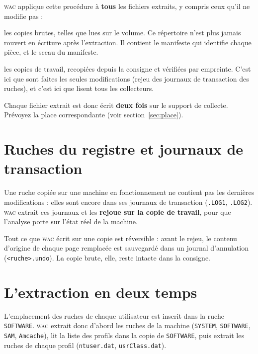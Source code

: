 \documentclass[11pt,a4paper,oneside]{report}
\newcommand{\wac}{\textsc{wac}}
\newcommand{\fichier}[1]{\texttt{#1}}
\begin{document}
\wac{} applique cette procédure à \textbf{tous} les fichiers extraits, y compris
ceux qu'il ne modifie pas :

\begin{description}[style=nextline,leftmargin=1.2em]
  \item[\fichier{consigne/}] les copies brutes, telles que lues sur le volume. Ce
        répertoire n'est plus jamais rouvert en écriture après l'extraction. Il
        contient le manifeste qui identifie chaque pièce, et le sceau du
        manifeste.
  \item[\fichier{travail/}] les copies de travail, recopiées depuis la consigne
        et vérifiées par empreinte. C'est ici que sont faites les seules
        modifications (rejeu des journaux de transaction des ruches), et c'est ici
        que lisent tous les collecteurs.
\end{description}

\begin{note}
Chaque fichier extrait est donc écrit \textbf{deux fois} sur le support de
collecte. Prévoyez la place correspondante (voir
section~\ref{sec:place}).
\end{note}

\section{Ruches du registre et journaux de transaction}

Une ruche copiée sur une machine en fonctionnement ne contient pas les dernières
modifications : elles sont encore dans ses journaux de transaction
(\fichier{.LOG1}, \fichier{.LOG2}). \wac{} extrait ces journaux et les
\textbf{rejoue sur la copie de travail}, pour que l'analyse porte sur l'état réel
de la machine.

Tout ce que \wac{} écrit sur une copie est réversible : avant le rejeu, le contenu
d'origine de chaque page remplacée est sauvegardé dans un journal d'annulation
(\fichier{<ruche>.undo}). La copie brute, elle, reste intacte dans la consigne.

\section{L'extraction en deux temps}

L'emplacement des ruches de chaque utilisateur est inscrit dans la ruche
\fichier{SOFTWARE}. \wac{} extrait donc d'abord les ruches de la machine
(\fichier{SYSTEM}, \fichier{SOFTWARE}, \fichier{SAM}, \fichier{Amcache}), lit la
liste des profils dans la copie de \fichier{SOFTWARE}, puis extrait les ruches de
chaque profil (\fichier{ntuser.dat}, \fichier{usrClass.dat}).
\end{document}
